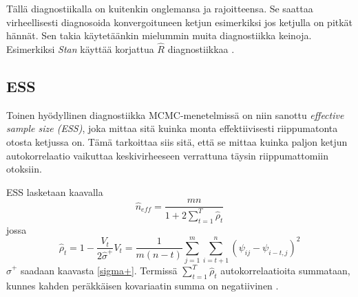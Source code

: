 Tällä diagnostiikalla on kuitenkin onglemansa ja rajoitteensa. Se saattaa virheellisesti diagnosoida konvergoituneen ketjun esimerkiksi jos ketjulla on pitkät hännät. Sen takia käytetäänkin mielummin muita diagnostiikka keinoja. Esimerkiksi \textit{Stan} käyttää korjattua $\hat{R}$ diagnostiikkaa \cite{vehtari_2019}.

\subsection{ESS}

Toinen hyödyllinen diagnostiikka MCMC-menetelmissä on niin sanottu \textit{effective sample size (ESS)}, joka mittaa sitä kuinka monta effektiivisesti riippumatonta otosta ketjussa on. Tämä tarkoittaa siis sitä, että se mittaa kuinka paljon ketjun autokorrelaatio vaikuttaa keskivirheeseen verrattuna täysin riippumattomiin otoksiin.
\begin{maar}
	ESS lasketaan kaavalla
	\begin{equation}
		\hat{n}_{eff}=\frac{mn}{1+2\sum_{t=1}^{T}\hat{\rho}_t}
	\end{equation}
	jossa 
	\begin{subequations}
	\begin{equation}
		\hat{\rho}_t = 1 - \frac{V_t}{2\hat{\sigma}^+}
	\end{equation}
	\begin{equation}
		V_t=\frac{1}{m(n-t)}\sum_{j=1}^{m}\sum_{i=t+1}^{n}(\psi_{ij}-\psi_{i-t,j})^2
	\end{equation}
	\end{subequations}
	$\hat{\sigma}^+$ saadaan kaavasta \ref{sigma+}. Termissä $\sum_{t=1}^{T}\hat{\rho}_t$ autokorrelaatioita summataan, kunnes kahden peräkkäisen kovariaatin summa on negatiivinen \cite{geyer_practical_1992}.
\end{maar}















